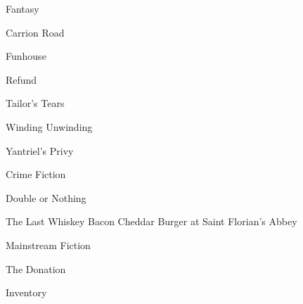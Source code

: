 
\begingroup

\def\genre#1{
  \bigskip
  {\infoheadingfont#1}
}
\def\genrebook#1{
  \medskip
  {\bodyit#1}
}

\centered

\genre{Fantasy}
  \genrebook{Carrion Road}
  \genrebook{Funhouse}
  \genrebook{Refund}
  \genrebook{Tailor's Tears}
  \genrebook{Winding Unwinding}
  \genrebook{Yantriel's Privy}

\genre{Crime Fiction}
  \genrebook{Double or Nothing}
  \genrebook{The Last Whiskey Bacon Cheddar Burger at Saint Florian's Abbey}

\genre{Mainstream Fiction}
  \genrebook{The Donation}
  \genrebook{Inventory}

\endgroup
